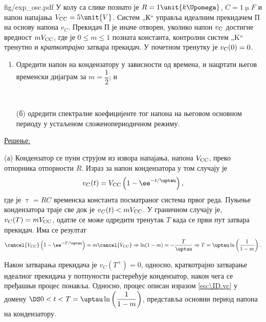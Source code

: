 \mnDifficult
\begin{slikaDesno}[0.833]{fig/exp_osc.pdf}
\PID У колу са слике познато је 
$R = 1\unit{k\Upomega}$, $C=1\unit{\upmu F}$ и 
напон напајања $V_{\rm CC} = 5\unit{V}$.
Систем „К“ управља идеалним прекидачем П 
на основу напона $v_{C}$. Прекидач П је иначе 
отворен, уколико напон $v_{\rm C}$ достигне вредност 
$mV_{\rm CC}$, где је $0 \leq m \leq 1$ позната 
константа, контролни систем „K“ тренутно и 
\textit{краткотрајно} затвара прекидач. У почетном 
тренутку је $v_{\rm C}(0) = 0$. 
\begin{enumerate}[label=(\alph*)]
\item Одредити  напон 
на кондензатору у зависности од времена, и нацртати његов временски 
дијаграм за $m = \dfrac{1}{2}$; и
\end{enumerate}
\end{slikaDesno} \\
%
\begin{enumerate}
    \item[(б)] одредити спектралне коефицијенте 
    тог напона на његовом основном периоду у устаљеном 
    сложенопериодичном режиму. 
\end{enumerate}

\underline{\sc Решење:} 

(а) Кондензатор се пуни струјом из извора напајања, напона $V_{\rm CC}$,  
преко отпорника отпорности $R$. Израз за напон кондензатора у том случају је 
\begin{equation}
v_{C}(t) = V_{\rm CC} \left(
    1 - \ee^{-t/\uptau} 
\right), \label{eq:\ID.vc}
\end{equation} где је $\uptau = RC$ временска константа посматраног система првог реда. Пуњење кондензатора траје
све док је $v_C(t) < m V_{\rm CC}$. У граничном случају је, 
$v_C(T) = m V_{\rm CC}$, одатле се може одредити тренутак $T$ када се први пут затвара прекидач. 
Има се резултат
\begin{equation}
    \cancel {V_{\rm CC}} \left(
    1 - \ee^{-T/\uptau} \right) = m \cancel{V_{\rm CC}}
    \Rightarrow \ln(1 - m) = -\dfrac{T}{\uptau} \Rightarrow 
    T = \uptau \ln \left( \dfrac{1}{1 - m} \right).
\end{equation}

Након затварања прекидача је $v_{C}(T^+) = 0$, односно, краткотрајно затварање идеалног прекидача 
у потпуности растерећује кондензатор, након чега се пређашњи процес понавља. 
Односно, процес описан изразом \eqref{eq:\ID.vc} у домену 
$\DS 0 < t < T = \uptau \ln \left( \dfrac{1}{1 - m} \right)$, представља основни период напона
на кондензатору. 

